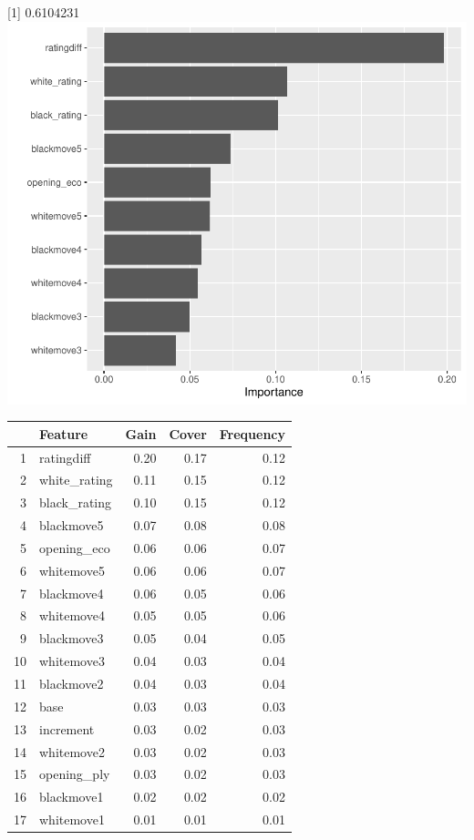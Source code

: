 \documentclass[11pt,preprint, authoryear]{elsarticle}
\let\origtable\table
\let\endorigtable\endtable
\renewenvironment{table}[1][2] {
    \expandafter\origtable\expandafter[H]
} {
    \endorigtable
}
\numberwithin{equation}{section}
\numberwithin{figure}{section}
\numberwithin{table}{section}
\begin{document}
{[}1{]} 0.6104231
\includegraphics{WriteUp_files/figure-latex/unnamed-chunk-3-1.pdf}

\begin{table}[ht]
\centering
\begin{tabular}{rlrrr}
  \hline
 & Feature & Gain & Cover & Frequency \\ 
  \hline
1 & ratingdiff & 0.20 & 0.17 & 0.12 \\ 
  2 & white\_rating & 0.11 & 0.15 & 0.12 \\ 
  3 & black\_rating & 0.10 & 0.15 & 0.12 \\ 
  4 & blackmove5 & 0.07 & 0.08 & 0.08 \\ 
  5 & opening\_eco & 0.06 & 0.06 & 0.07 \\ 
  6 & whitemove5 & 0.06 & 0.06 & 0.07 \\ 
  7 & blackmove4 & 0.06 & 0.05 & 0.06 \\ 
  8 & whitemove4 & 0.05 & 0.05 & 0.06 \\ 
  9 & blackmove3 & 0.05 & 0.04 & 0.05 \\ 
  10 & whitemove3 & 0.04 & 0.03 & 0.04 \\ 
  11 & blackmove2 & 0.04 & 0.03 & 0.04 \\ 
  12 & base & 0.03 & 0.03 & 0.03 \\ 
  13 & increment & 0.03 & 0.02 & 0.03 \\ 
  14 & whitemove2 & 0.03 & 0.02 & 0.03 \\ 
  15 & opening\_ply & 0.03 & 0.02 & 0.03 \\ 
  16 & blackmove1 & 0.02 & 0.02 & 0.02 \\ 
  17 & whitemove1 & 0.01 & 0.01 & 0.01 \\ 
   \hline
\end{tabular}
\end{table}
\end{document}
